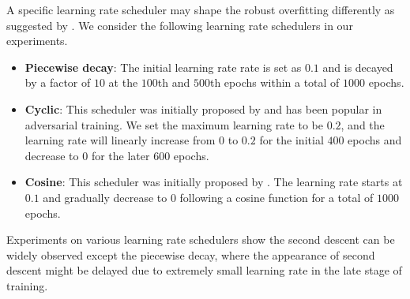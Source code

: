

A specific learning rate scheduler may shape the robust overfitting differently as suggested by \citet{Rice2020OverfittingIA}. We consider the following learning rate schedulers in our experiments.
\begin{itemize}[leftmargin=*]
    \item \textbf{Piecewise decay}: The initial learning rate rate is set as $0.1$ and is decayed by a factor of $10$ at the $100$th and $500$th epochs within a total of $1000$ epochs.
    \item \textbf{Cyclic}: This scheduler was initially proposed by \citet{Smith2017CyclicalLR} and has been popular in adversarial training. We set the maximum learning rate to be $0.2$, and the learning rate will linearly increase from $0$ to $0.2$ for the initial $400$ epochs and decrease to $0$ for the later $600$ epochs.
    \item \textbf{Cosine}: This scheduler was initially proposed by \citet{Loshchilov2017SGDRSG}. The learning rate starts at $0.1$ and gradually decrease to $0$ following a cosine function for a total of $1000$ epochs.
\end{itemize}
Experiments on various learning rate schedulers show the second descent can be widely observed except the piecewise decay, where the appearance of second descent might be delayed due to extremely small learning rate in the late stage of training. 






% 
% 
% 
% 

% 
